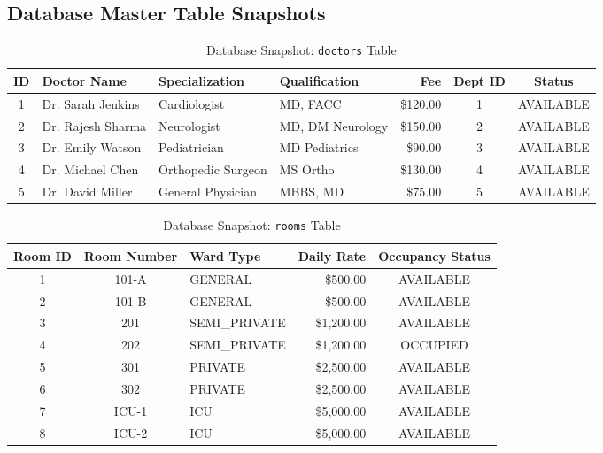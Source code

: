 \documentclass[12pt,a4paper]{article}
\begin{document}
\subsection{Database Master Table Snapshots}
\begin{table}[H]
\centering
\small
\caption{Database Snapshot: \texttt{doctors} Table}
\vspace{0.15cm}
\begin{tabularx}{\textwidth}{|c|l|l|l|r|c|c|}
\hline
\textbf{ID} & \textbf{Doctor Name} & \textbf{Specialization} & \textbf{Qualification} & \textbf{Fee} & \textbf{Dept ID} & \textbf{Status} \\
\hline
1 & Dr. Sarah Jenkins & Cardiologist       & MD, FACC         & \$120.00 & 1 & AVAILABLE \\
\hline
2 & Dr. Rajesh Sharma & Neurologist        & MD, DM Neurology & \$150.00 & 2 & AVAILABLE \\
\hline
3 & Dr. Emily Watson  & Pediatrician       & MD Pediatrics    & \$90.00  & 3 & AVAILABLE \\
\hline
4 & Dr. Michael Chen  & Orthopedic Surgeon & MS Ortho         & \$130.00 & 4 & AVAILABLE \\
\hline
5 & Dr. David Miller  & General Physician  & MBBS, MD         & \$75.00  & 5 & AVAILABLE \\
\hline
\end{tabularx}
\end{table}

\begin{table}[H]
\centering
\small
\caption{Database Snapshot: \texttt{rooms} Table}
\vspace{0.15cm}
\begin{tabularx}{\textwidth}{|c|c|l|r|c|}
\hline
\textbf{Room ID} & \textbf{Room Number} & \textbf{Ward Type} & \textbf{Daily Rate} & \textbf{Occupancy Status} \\
\hline
1 & 101-A & GENERAL       & \$500.00   & AVAILABLE \\
\hline
2 & 101-B & GENERAL       & \$500.00   & AVAILABLE \\
\hline
3 & 201   & SEMI\_PRIVATE & \$1,200.00 & AVAILABLE \\
\hline
4 & 202   & SEMI\_PRIVATE & \$1,200.00 & OCCUPIED  \\
\hline
5 & 301   & PRIVATE       & \$2,500.00 & AVAILABLE \\
\hline
6 & 302   & PRIVATE       & \$2,500.00 & AVAILABLE \\
\hline
7 & ICU-1 & ICU           & \$5,000.00 & AVAILABLE \\
\hline
8 & ICU-2 & ICU           & \$5,000.00 & AVAILABLE \\
\hline
\end{tabularx}
\end{table}
\end{document}
